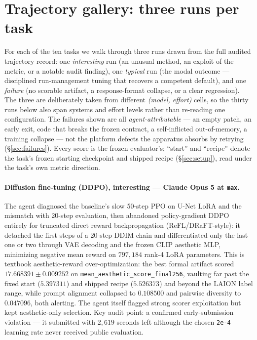 \section{Trajectory gallery: three runs per task}
\label{app:traj}

For each of the ten tasks we walk through three runs drawn from the full audited trajectory record:
one \emph{interesting} run (an unusual method, an exploit of the metric, or a notable audit finding),
one \emph{typical} run (the modal outcome --- disciplined run-management tuning that recovers a
competent default), and one \emph{failure} (no scorable artifact, a response-format collapse, or a
clear regression). The three are deliberately taken from different \emph{(model, effort)} cells, so the
thirty runs below also span systems and effort levels rather than re-reading one configuration. The
failures shown are all \emph{agent-attributable} --- an empty patch, an early exit, code that breaks
the frozen contract, a self-inflicted out-of-memory, a training collapse --- not the platform defects
the apparatus absorbs by retrying (\S\ref{sec:failures}). Every score is the frozen evaluator's;
``start'' and ``recipe'' denote the task's frozen starting checkpoint and shipped recipe
(\S\ref{sec:setup}), read under the task's own metric direction.

\paragraph{Diffusion fine-tuning (DDPO), interesting --- Claude Opus 5 at \texttt{max}.} The agent diagnosed the baseline's slow 50-step PPO on U-Net LoRA and the mismatch with 20-step evaluation, then abandoned policy-gradient DDPO entirely for truncated direct reward backpropagation (ReFL/DRaFT-style): it detached the first steps of a 20-step DDIM chain and differentiated only the last one or two through VAE decoding and the frozen CLIP aesthetic MLP, minimizing negative mean reward on $797{,}184$ rank-4 LoRA parameters. This is textbook aesthetic-reward over-optimization: the best formal artifact scored $17.668391 \pm 0.009252$ on \texttt{mean\_aesthetic\_score\_final256}, vaulting far past the fixed start ($5.397311$) and shipped recipe ($5.526373$) and beyond the LAION label range, while prompt alignment collapsed to $0.108500$ and pairwise diversity to $0.047096$, both alerting. The agent itself flagged strong scorer exploitation but kept aesthetic-only selection. Key audit point: a confirmed early-submission violation --- it submitted with $2{,}619$ seconds left although the chosen \texttt{2e-4} learning rate never received public evaluation.

